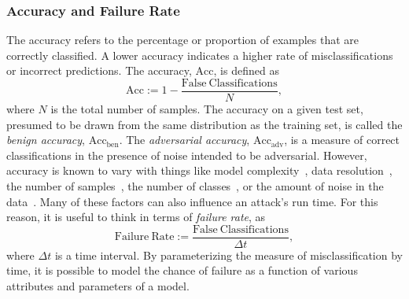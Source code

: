 \subsubsection{Accuracy and Failure Rate}
The accuracy refers to the percentage or proportion of examples that are correctly classified. A lower accuracy indicates a higher rate of misclassifications or incorrect predictions. The accuracy, $\mathrm{Acc}$, is defined as
\begin{equation}
    \mathrm{Acc} := 1 - \frac{\mathrm{False~Classifications}}{N},
    \label{eq:acc}
\end{equation}
where $N$ is the total number of samples. The accuracy on a given test set, presumed to be drawn from the same distribution as the training set, is called the \textit{benign accuracy}, $\mathrm{Acc}_{\mathrm{ben}}$. The \textit{adversarial accuracy}, $\mathrm{Acc}_{\mathrm{adv}}$, is a measure of correct classifications in the presence of noise intended to be adversarial. However, accuracy is known to vary with things like model complexity~\cite{vgg,resnet}, data resolution~\cite{feature_squeezing}, the number of samples~\cite{vapnik1994measuring}, the number of classes~\cite{dohmatob_generalized_2019}, or the amount of noise in the data~\cite{gauss_aug,gauss_out,dohmatob_generalized_2019}. Many of these factors can also influence an attack's run time. For this reason, it is useful to think in terms of \textit{failure rate}, as
\begin{equation}
    \mathrm{Failure~Rate} := \frac{\mathrm{False~Classifications}}{\Delta t} ,
    \label{eq:failure_rate}
\end{equation}
where $\Delta t$ is a time interval. By parameterizing the measure of misclassification by time, it is possible to model the chance of failure as a function of various attributes and parameters of a model.

